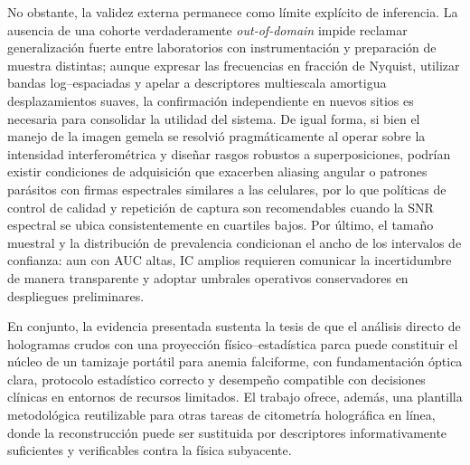 No obstante, la validez externa permanece como límite explícito de inferencia. La ausencia de una cohorte verdaderamente \emph{out-of-domain} impide reclamar generalización fuerte entre laboratorios con instrumentación y preparación de muestra distintas; aunque expresar las frecuencias en fracción de Nyquist, utilizar bandas log–espaciadas y apelar a descriptores multiescala amortigua desplazamientos suaves, la confirmación independiente en nuevos sitios es necesaria para consolidar la utilidad del sistema. De igual forma, si bien el manejo de la imagen gemela se resolvió pragmáticamente al operar sobre la intensidad interferométrica y diseñar rasgos robustos a superposiciones, podrían existir condiciones de adquisición que exacerben aliasing angular o patrones parásitos con firmas espectrales similares a las celulares, por lo que políticas de control de calidad y repetición de captura son recomendables cuando la SNR espectral se ubica consistentemente en cuartiles bajos. Por último, el tamaño muestral y la distribución de prevalencia condicionan el ancho de los intervalos de confianza: aun con AUC altas, IC amplios requieren comunicar la incertidumbre de manera transparente y adoptar umbrales operativos conservadores en despliegues preliminares.

En conjunto, la evidencia presentada sustenta la tesis de que el análisis directo de hologramas crudos con una proyección físico–estadística parca puede constituir el núcleo de un tamizaje portátil para anemia falciforme, con fundamentación óptica clara, protocolo estadístico correcto y desempeño compatible con decisiones clínicas en entornos de recursos limitados. El trabajo ofrece, además, una plantilla metodológica reutilizable para otras tareas de citometría holográfica en línea, donde la reconstrucción puede ser sustituida por descriptores informativamente suficientes y verificables contra la física subyacente.

